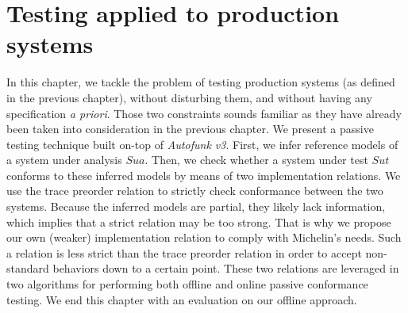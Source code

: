 %
\chapter{Testing applied to production systems}
\label{sec:testing}

In this chapter, we tackle the problem of testing production
systems (as defined in the previous chapter), without disturbing
them, and without having any specification \emph{a priori}. Those
two constraints sounds familiar as they have already been taken
into consideration in the previous chapter. We present a passive
testing technique built on-top of \emph{Autofunk v3}. First, we
infer reference models of a system under analysis $\mathit{Sua}$.
Then, we check whether a system under test $\mathit{Sut}$
conforms to these inferred models by means of two implementation
relations. We use the trace preorder relation to strictly check
conformance between the two systems. Because the inferred models
are partial, they likely lack information, which implies that a
strict relation may be too strong. That is why we propose our own
(weaker) implementation relation to comply with Michelin's needs.
Such a relation is less strict than the trace preorder relation
in order to accept non-standard behaviors down to a certain point.
These two relations are leveraged in two algorithms for
performing both offline and online passive conformance testing.
We end this chapter with an evaluation on our offline approach.\\

\minitoc

\pagebreak






\cleardoublepage
\blankpage
